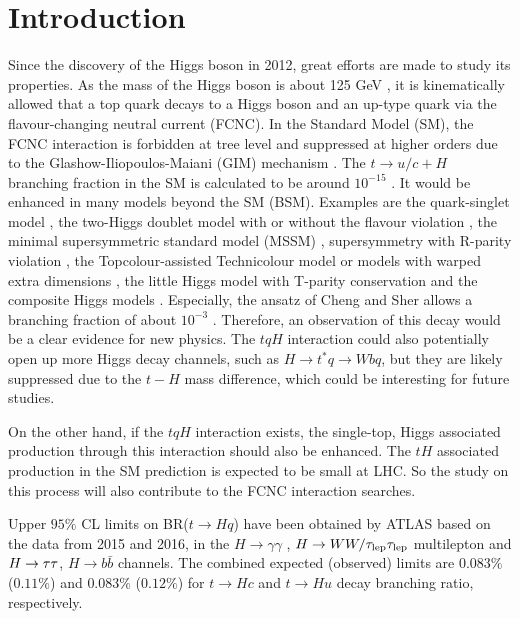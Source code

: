 \section{Introduction}
\label{sec:intro}
Since the discovery of the Higgs boson in 2012, great efforts are made to study its properties. As the mass of the Higgs boson is about 125 GeV \cite{HiggsMass}, it is kinematically allowed that a top quark decays to a Higgs boson and an up-type quark via the flavour-changing neutral current (FCNC). In the Standard Model (SM), the FCNC interaction is forbidden at tree level and suppressed at higher orders due to the Glashow-Iliopoulos-Maiani (GIM) mechanism \cite{GIM}. The $t\to u/c+H$ branching fraction in the SM is calculated to be around $10^{-15}$ \cite{brtch3}. It would be enhanced in many models beyond the SM (BSM). Examples are the quark-singlet model \cite{quarkSinglet1,quarkSinglet2}, the two-Higgs doublet model with or without the flavour violation \cite{2hdm1,2hdm2}, the minimal supersymmetric standard model (MSSM) \cite{2hdm3}, supersymmetry with R-parity violation \cite{Rparity},
the Topcolour-assisted Technicolour model \cite{Techni} or models with warped extra dimensions \cite{extraD}, the little Higgs model with T-parity conservation \cite{littleH} and the composite Higgs models \cite{compositeH}.
Especially, the ansatz of Cheng and Sher \cite{Sher} allows a branching fraction of about $10^{-3}$ \cite{FCNC_rate}. Therefore, an observation of this decay would be a clear evidence for new physics. The $tqH$ interaction could also potentially open up more Higgs decay channels,
such as $H\rightarrow t^*q\rightarrow Wbq$, but they are likely suppressed due to the $t-H$ mass difference, which could be interesting for future studies.

On the other hand, if the $tqH$ interaction exists, the single-top, Higgs associated production through this interaction should also be enhanced. The $tH$ associated production in the SM prediction is expected to be small at LHC\cite{tHjb_production}. So the study on this process will also contribute to the FCNC interaction searches.

Upper $95\%$ CL limits on BR($t\to Hq$) have been obtained by ATLAS based on the data from 2015 and 2016, in the $H\to\gamma\gamma$ \cite{fcncgmgm}, $H\to WW/\tau_\text{lep}{}\tau_\text{lep}$ multilepton \cite{fcncml} and  $H \rightarrow \tau\tau$, $H\to b\bar{b}$ \cite{fcnctautau} channels. The combined expected (observed) limits are $0.083\%$ ($0.11\%$) and $0.083\%$ ($0.12\%$) for $t\to Hc$ and $t\to Hu$ decay branching ratio, respectively. 

